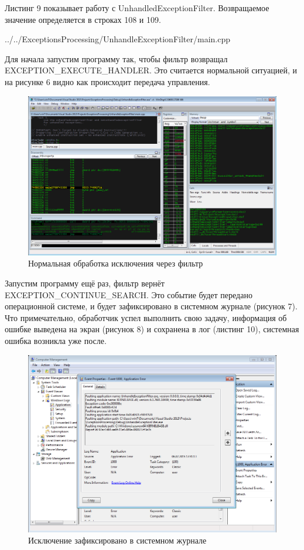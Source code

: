 \documentclass[a4paper, 12pt]{report}		%
\begin{document}
Листинг 9 показывает работу с UnhandledExceptionFilter. Возвращаемое значение определяется в строках 108 и 109.


{../../ExceptionsProcessing/UnhandleExceptionFilter/main.cpp}

Для начала запустим программу так, чтобы фильтр возвращал EXCEPTION\_EXECUTE\_HANDLER. Это считается нормальной ситуацией, и на рисунке 6 видно как происходит передача управления.

\begin{figure}[h!]
\centering
\includegraphics[scale=0.5]{res/006}
\caption{Нормальная обработка исключения через фильтр}
\end{figure}

Запустим программу ещё раз,  фильтр вернёт EXCEPTION\_CONTINUE\_SEARCH. Это событие будет передано операционной системе, и будет зафиксировано в системном журнале (рисунок 7). Что примечательно, обработчик успел выполнить свою задачу, информация об ошибке выведена на экран (рисунок 8) и сохранена в лог (листинг 10), системная ошибка возникла уже после.

\begin{figure}[h!]
\centering
\includegraphics[scale=0.63]{res/007}
\caption{Исключение зафиксировано в системном журнале}
\end{figure}
\end{document}
